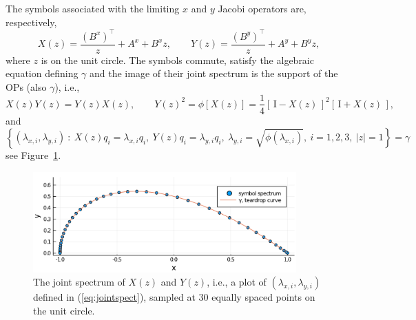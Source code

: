 \documentclass[12pt,a4paper]{article}
\begin{document}
The symbols associated with the limiting $x$ and $y$ Jacobi operators are, respectively,
\begin{equation*}
X(z) = \frac{\left(B^x\right)^{\intercal}}{z} + A^x + B^x z, \qquad
Y(z) = \frac{\left(B^y\right)^{\intercal}}{z} + A^y + B^y z, 
\end{equation*}
where $z$ is on the unit circle. The symbols commute, satisfy the algebraic equation defining $\gamma$ and the image of their joint spectrum is the support of the OPs (also $\gamma$), i.e., 
\begin{equation*}
X(z)Y(z) = Y(z)X(z), \qquad Y(z)^2 = \phi\left[X(z) \right] = \frac{1}{4}\left[\,\mathrm{I} - X(z)\,\right]^2\left[\,\mathrm{I} + X(z)\,\right],
\end{equation*}
and
\begin{equation}
\left\lbrace (\lambda_{x,i}, \lambda_{y,i}) \: : \:  X(z)q_i = \lambda_{x,i} q_i, \: Y(z)q_i = \lambda_{y,i} q_i, \: \lambda_{y,i} = \sqrt{\phi(\lambda_{x,i})}, \: i = 1, 2, 3,\: \vert z \vert = 1 \right\rbrace = \gamma
\label{eq:jointspect}
\end{equation}
see Figure~\ref{fig:symbolspectrum}.
\begin{figure}
	\centering
	\includegraphics[width = 0.9\textwidth]{symbol_spectrum.pdf}
	\caption{The joint spectrum of $X(z)$ and $Y(z)$, i.e., a plot of $(\lambda_{x,i}, \lambda_{y,i})$ defined in (\ref{eq:jointspect}), sampled at $30$ equally spaced points on the unit circle.    }   
	\label{fig:symbolspectrum}
\end{figure}
\end{document}
